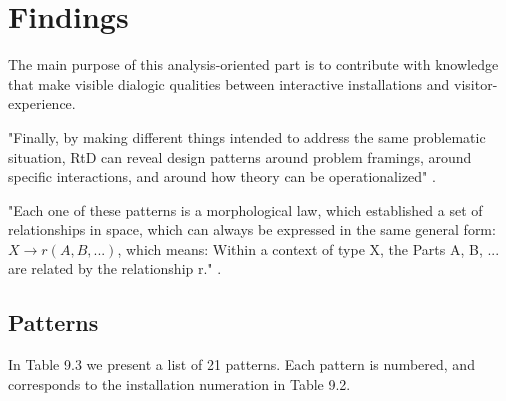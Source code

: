 \section{Findings}
The main purpose of this analysis-oriented part is to contribute with knowledge that make visible dialogic qualities between interactive installations and visitor-experience. 

"Finally, by making different things intended to address the same problematic situation, RtD can reveal design patterns \autocite{Alexander_book} around problem framings, around specific interactions, and around how theory can be operationalized" \autocite[p. 178]{zimmerman_research_2014}.


"Each one of these patterns is a morphological law, which established a set of relationships in space, which can always be expressed in the same general form: $X \rightarrow r (A, B, ...)$, which means: Within a context of type X, the Parts A, B, ... are related by the relationship r." \autocite[p. 90]{Alexander_book}.


\subsection{Patterns}
In Table 9.3 we present a list of 21 patterns. Each pattern is numbered, and corresponds to the installation numeration in Table 9.2. 


